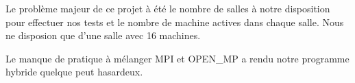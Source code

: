 \par Le problème majeur de ce projet à été le nombre de salles à notre disposition 
pour effectuer nos tests et le nombre de machine actives dans chaque salle.
Nous ne disposion que d'une salle avec 16 machines. 

\par Le manque de pratique à mélanger MPI et OPEN\_MP a rendu notre programme 
hybride quelque peut hasardeux.
